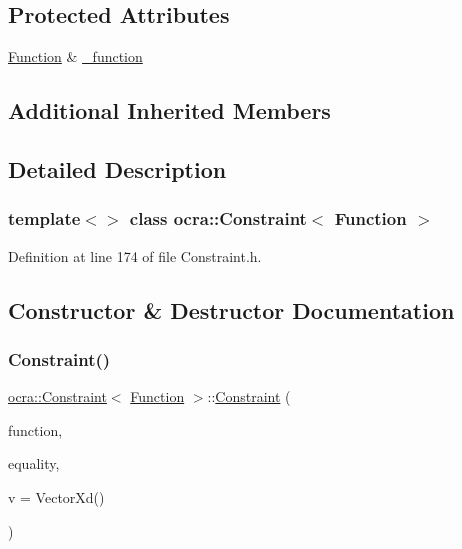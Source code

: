 \subsection*{Protected Attributes}
\begin{DoxyCompactItemize}
\item 
\hyperlink{classocra_1_1Function}{Function} \& \hyperlink{classocra_1_1Constraint_3_01Function_01_4_a51f8ef2f03da02c092aff7db27b325b6}{\+\_\+function}
\end{DoxyCompactItemize}
\subsection*{Additional Inherited Members}


\subsection{Detailed Description}
\subsubsection*{template$<$$>$\newline
class ocra\+::\+Constraint$<$ Function $>$}



Definition at line 174 of file Constraint.\+h.



\subsection{Constructor \& Destructor Documentation}
\hypertarget{classocra_1_1Constraint_3_01Function_01_4_aefef89fd502e8f1fed23be307f71b508}{}\label{classocra_1_1Constraint_3_01Function_01_4_aefef89fd502e8f1fed23be307f71b508} 
\subsubsection{\texorpdfstring{Constraint()}{Constraint()}\hspace{0.1cm}{\footnotesize\ttfamily [1/2]}}
{\footnotesize\ttfamily \hyperlink{classocra_1_1Constraint}{ocra\+::\+Constraint}$<$ \hyperlink{classocra_1_1Function}{Function} $>$\+::\hyperlink{classocra_1_1Constraint}{Constraint} (\begin{DoxyParamCaption}\item[{\hyperlink{classocra_1_1Function}{Function} $\ast$}]{function,  }\item[{bool}]{equality,  }\item[{const Vector\+Xd \&}]{v = {\ttfamily VectorXd()} }\end{DoxyParamCaption})\hspace{0.3cm}{\ttfamily [inline]}}


